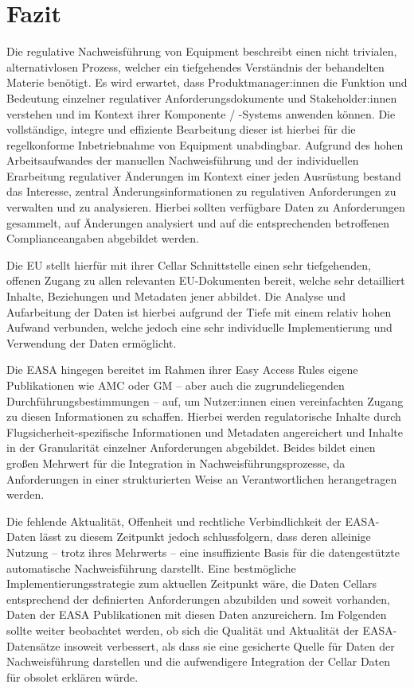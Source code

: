 \chapter{Fazit}

    Die regulative Nachweisführung von \atmans{} Equipment beschreibt einen nicht trivialen, alternativlosen Prozess, welcher ein tiefgehendes Verständnis der behandelten Materie benötigt.
    Es wird erwartet, dass Produktmanager:innen die Funktion und Bedeutung einzelner regulativer Anforderungsdokumente und Stakeholder:innen verstehen und im Kontext ihrer \atmans{} Komponente / -Systems anwenden können.
    Die vollständige, integre und effiziente Bearbeitung dieser ist hierbei für die regelkonforme Inbetriebnahme von \atmans{} Equipment unabdingbar.
    Aufgrund des hohen Arbeitsaufwandes der manuellen Nachweisführung und der individuellen Erarbeitung regulativer Änderungen im Kontext einer jeden \atmans{} Ausrüstung bestand das Interesse, zentral Änderungsinformationen zu regulativen Anforderungen zu verwalten und zu analysieren.
    Hierbei sollten verfügbare Daten zu Anforderungen gesammelt, auf Änderungen analysiert und auf die entsprechenden betroffenen Complianceangaben abgebildet werden.
    
    \medskip
    Die \ac{EU} stellt hierfür mit ihrer Cellar Schnittstelle einen sehr tiefgehenden, offenen Zugang zu allen relevanten \ac{EU}-Dokumenten bereit, welche sehr detailliert Inhalte, Beziehungen und Metadaten jener abbildet. 
    Die Analyse und Aufarbeitung der Daten ist hierbei aufgrund der Tiefe mit einem relativ hohen Aufwand verbunden, welche jedoch eine sehr individuelle Implementierung und Verwendung der Daten ermöglicht.
    
    \medskip
    Die \ac{EASA} hingegen bereitet im Rahmen ihrer Easy Access Rules eigene Publikationen wie \ac{AMC} oder \ac{GM} -- aber auch die zugrundeliegenden Durchführungsbestimmungen -- auf, um Nutzer:innen einen vereinfachten Zugang zu diesen Informationen zu schaffen.
    Hierbei werden regulatorische Inhalte durch Flug\-sicher\-heit-spezifische Informationen und Metadaten angereichert und Inhalte in der Granularität einzelner Anforderungen abgebildet. 
    Beides bildet einen großen Mehrwert für die Integration in Nachweisführungsprozesse, da Anforderungen in einer strukturierten Weise an Verantwortlichen herangetragen werden.
    
    \medskip
    Die fehlende Aktualität, Offenheit und rechtliche Verbindlichkeit der \ac{EASA}-Daten lässt zu diesem Zeitpunkt jedoch schlussfolgern, dass deren alleinige Nutzung -- trotz ihres Mehrwerts -- eine insuffiziente Basis für die datengestützte automatische Nachweisführung darstellt. 
    Eine bestmögliche Implementierungsstrategie zum aktuellen Zeitpunkt wäre, die Daten Cellars entsprechend der definierten Anforderungen abzubilden und soweit vorhanden, Daten der \ac{EASA} Publikationen mit diesen Daten anzureichern.
    Im Folgenden sollte weiter beobachtet werden, ob sich die Qualität und Aktualität der \ac{EASA}-Datensätze insoweit verbessert, als dass sie eine gesicherte Quelle für Daten der Nachweisführung darstellen und die aufwendigere Integration der Cellar Daten für obsolet erklären würde.
